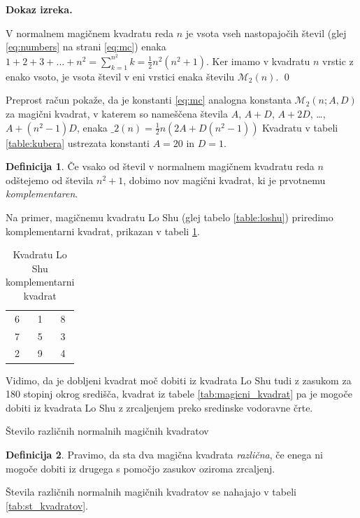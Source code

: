 \documentclass[a4paper,12pt]{article}
\theoremstyle{definition}
\newtheorem{definicija}{Definicija}
\theoremstyle{plain}
\newcommand{\m}{\mathcal{M}}
\newcommand{\pojem}[1]{\emph{\color{purple}#1}}
\newenvironment{dokaz}{%
    \noindent\textbf{Dokaz izreka.}\hspace{1em}%
}{%
    \hspace*{\fill}\qed %
}
\newenvironment{magic}[3]{%
    \begin{table}[ht]
    \centering
    \caption{#2}
    \label{#3}
    \begin{tabular}{|*{#1}{c|}} %
    \hline
}{%
    \hline
    \end{tabular}
    \end{table}
}
\begin{document}
\begin{dokaz}
   V normalnem magičnem kvadratu reda $n$ je vsota vseh nastopajočih
   števil (glej \eqref{eq:numbers} na strani \eqref{eq:mc}) enaka
   $1+2+3+\dots+n^2=\sum_{k=1}^{n^2}k=\frac{1}{2}n^2(n^2+1)$. Ker imamo
   v kvadratu $n$ vrstic z enako vsoto, je vsota števil v eni vrstici
   enaka številu $\m_2(n)$. %
\end{dokaz}

Preprost račun pokaže, da je konstanti \eqref{eq:mc} analogna konstanta
$\m_2(n;A,D)$ za magični kvadrat, v katerem so nameščena števila
$A$, $A+D$, $A+2D$, \dots, $A+(n^2-1)D$, enaka %
$\_2(n)=\frac{1}{2} n(2A+D(n^2-1))$
Kvadratu v tabeli \ref{table:kubera} ustrezata konstanti $A=20$ in $D=1$.

\begin{definicija}
      Če vsako od števil v normalnem magičnem kvadratu reda $n$ odštejemo
      od števila $n^2+1$, dobimo nov magični kvadrat, ki je prvotnemu
      \pojem{komplementaren}.
\end{definicija}

Na primer, magičnemu kvadratu Lo Shu (glej tabelo \ref{table:loshu}) priredimo
komplementarni kvadrat, prikazan v tabeli \ref{table:closhu}.
%
\begin{magic}{3}{Kvadratu Lo Shu komplementarni kvadrat}{table:closhu}
6 & 1 & 8 \\
7 & 5 & 3 \\
2 & 9 & 4 \\
\end{magic}


Vidimo, da je dobljeni kvadrat moč dobiti iz kvadrata Lo Shu tudi z zasukom za
180 stopinj okrog središča, kvadrat iz tabele \ref{tab:magicni_kvadrat} pa je mogoče dobiti
iz kvadrata Lo Shu z zrcaljenjem preko sredinske vodoravne črte.

Število različnih normalnih magičnih kvadratov

\begin{definicija}
      Pravimo, da sta dva magična kvadrata \pojem{različna}, če enega ni mogoče dobiti
      iz drugega s pomočjo zasukov oziroma zrcaljenj.
\end{definicija}

Števila različnih normalnih magičnih kvadratov se nahajajo v tabeli \ref{tab:st_kvadratov}.
\end{document}
